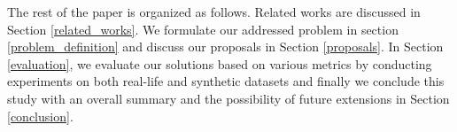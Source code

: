 The rest of the paper is organized as follows. Related works are discussed in Section \ref{related_works}. We formulate our addressed problem in section \ref{problem_definition} and discuss our proposals in Section \ref{proposals}. In Section \ref{evaluation}, we evaluate our solutions based on various metrics by conducting experiments on both real-life and synthetic datasets and finally we conclude this study with an overall summary and the possibility of future extensions in Section \ref{conclusion}.




%
%



